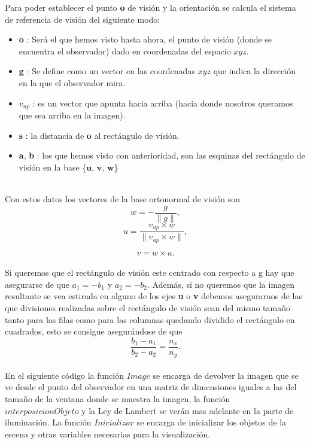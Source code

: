Para poder establecer el punto \textbf{o} de visión y la orientación se calcula el sistema de referencia de visión del siguiente modo:
\begin{itemize}
	\item \textbf{o} : Será el que hemos visto hasta ahora, el punto de visión (donde se encuentra el observador) dado en coordenadas del espacio $xyz$.
	\item \textbf{g} : Se define como un vector en las coordenadas $xyz$ que indica la dirección en la que el observador mira.
	\item \textbf{$v_{up}$} : es un vector que apunta hacia arriba (hacia donde nosotros queramos que sea arriba en la imagen).
	\item \textbf{s} : la distancia de \textbf{o} al rectángulo de visión.
	\item \textbf{a}, \textbf{b} : los que hemos visto con anterioridad, son las esquinas del rectángulo de visión en la base \{$\textbf{u}$, $\textbf{v}$, $\textbf{w}$\}
\end{itemize}
${ }$\\

Con estos datos los vectores de la base ortonormal de visión son
${ }$\\
	\[
		w = - \frac{g}{\parallel g \parallel},
	\]
	\[
		u = \frac{v_{up} \times w}{\parallel v_{up} \times w \parallel},
	\]
	
	\[
		v = w \times u.
	\]
	${ }$\\
	
Si queremos que el rectángulo de visión este centrado con respecto a g hay que asegurarse de que $a_1 = -b_1$ y $a_2 = -b_2$. Además, si no queremos que la imagen resultante se vea estirada en alguno de los ejes \textbf{u} o \textbf{v} debemos asegurarnos de las que divisiones realizadas sobre el rectángulo de visión sean del mismo tamaño tanto para las filas como para las columnas quedando dividido el rectángulo en cuadrados, esto se consigue asegurándose de que
${ }$\\
	\[
		\frac{b_1-a_1}{b_2 - a_2} = \frac{n_x}{n_y}.
	\]
	${ }$\\

En el siguiente código la función $Image$ se encarga de devolver la imagen que se ve desde el punto del observador en una matriz de dimensiones iguales a las del tamaño de la ventana donde se muestra la imagen, la función $interposicionObjeto$ y la Ley de Lambert se verán mas adelante en la parte de iluminación. La función $Inicializar$ se encarga de inicializar los objetos de la escena y otras variables necesarias para la visualización.
${ }$\\

